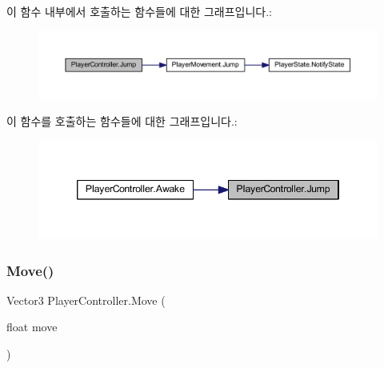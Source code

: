 \begin{DoxyCode}{0}

\end{DoxyCode}
이 함수 내부에서 호출하는 함수들에 대한 그래프입니다.\+:
\nopagebreak
\begin{figure}[H]
\begin{center}
\leavevmode
\includegraphics[width=350pt]{dc/dde/class_player_controller_a8a7010cb6f3c524737be3f6f77553df9_cgraph}
\end{center}
\end{figure}
이 함수를 호출하는 함수들에 대한 그래프입니다.\+:
\nopagebreak
\begin{figure}[H]
\begin{center}
\leavevmode
\includegraphics[width=346pt]{dc/dde/class_player_controller_a8a7010cb6f3c524737be3f6f77553df9_icgraph}
\end{center}
\end{figure}
\mbox{\label{class_player_controller_a50157884365897164379b8bad7ee4722}} 
\subsubsection{\texorpdfstring{Move()}{Move()}}
{\footnotesize\ttfamily Vector3 Player\+Controller.\+Move (\begin{DoxyParamCaption}\item[{float}]{move }\end{DoxyParamCaption})}



